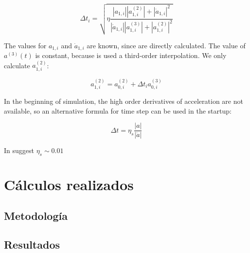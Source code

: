 \begin{appendixs}
	\begin{equation}
		\Delta t_i = \sqrt{\eta \frac{|a_{1, i}| |a^{(2)}_{1, i}| + |\dot{a}_{1, i}|^2}{|\dot{a}_{1, i}| |a^{(3)}_{1, i}| + |a^{(2)}_{1, i}|^2}}
	\end{equation}
	
	The values for $a_{1, i}$ and $\dot{a}_{1, i}$ are known, since are directly calculated. The value of $a^{(3)}(t)$ is constant, because is used a third-order interpolation. We only calculate $a^{(2)}_{1, i}$:
	
	\begin{equation}
		a^{(2)}_{1, i} = a^{(2)}_{0, i} + \Delta t_i a^{(3)}_{0, i}
	\end{equation}
	
	In the beginning of simulation, the high order derivatives of acceleration are not available, so an alternative formula for time step can be used in the startup:
	
	\begin{equation}
		\Delta t = \eta_s \frac{|a|}{|\dot{a}|}
	\end{equation}
	
	In \cite{makino1992} suggest $\eta_s \sim 0.01$
	
	\section{Cálculos realizados}

	\subsection{Metodología}
	\lipsum[1-2]


	\subsection{Resultados}
	\lipsum[10]


\end{appendixs}
